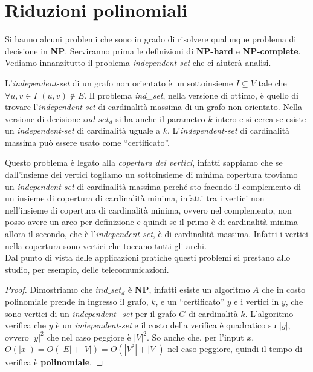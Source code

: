 			\section{Riduzioni polinomiali}
			Si hanno alcuni problemi che sono in grado di risolvere qualunque problema di
			decisione in \textbf{NP}. Serviranno prima le definizioni di \textbf{NP-hard} e
			\textbf{NP-complete}.\\
			Vediamo innanzitutto il problema \textit{independent-set} che ci aiuterà
			analisi.
			\begin{definizione}
				L'\textit{independent-set } di un grafo non orientato è un sottoinsieme
				$I\subseteq V$ tale che $\forall u,v\in I$ $(u,v)\not\in E$. Il problema
				\textit{ind\_set}, nella versione di ottimo, è quello di trovare
				l'\textit{independent-set} di cardinalità massima di un grafo non
				orientato. Nella versione di decisione $ind\_set_d$ si ha anche il parametro
				$k$ intero e si cerca se esiste un \textit{independent-set} di cardinalità
				uguale a $k$. L'\textit{independent-set} di cardinalità massima può essere
				usato come ``certificato''.
			\end{definizione}
			Questo problema è legato alla \textit{copertura dei vertici}, infatti sappiamo
			che se dall'insieme dei vertici togliamo un sottoinsieme di minima copertura
			troviamo un \textit{independent-set} di cardinalità massima perché sto facendo
			il complemento di un insieme di copertura di cardinalità minima, infatti tra i
			vertici non nell'insieme di copertura di cardinalità minima, ovvero nel
			complemento, non posso avere un arco per definizione e quindi se il primo è di
			cardinalità minima allora il secondo, che è l'\textit{independent-set}, è di
			cardinalità massima. Infatti i vertici nella copertura sono vertici che toccano
			tutti gli archi.\\
			Dal punto di vista delle applicazioni pratiche questi problemi si prestano allo
			studio, per esempio, delle telecomunicazioni.
			\begin{proof}
				Dimostriamo che $ind\_set_d$ è \textbf{NP}, infatti esiste un algoritmo $A$
				che in costo polinomiale prende in ingresso il grafo, $k$, e un
				``certificato'' $y$ e i vertici in $y$, che sono vertici di un
				\textit{independent\_set} per il grafo $G$ di cardinalità $k$. L'algoritmo
				verifica che $y$ è un \textit{independent-set} e il costo della verifica è
				quadratico su $|y|$, ovvero $|y|^2$ che nel caso peggiore è $|V|^2$. So anche
				che, per l'input $x$, $O(|x|)=O(|E|+|V|)=O(|V^2|+|V|)$ nel caso peggiore,
				quindi il tempo di verifica è \textbf{polinomiale}.
			\end{proof}
